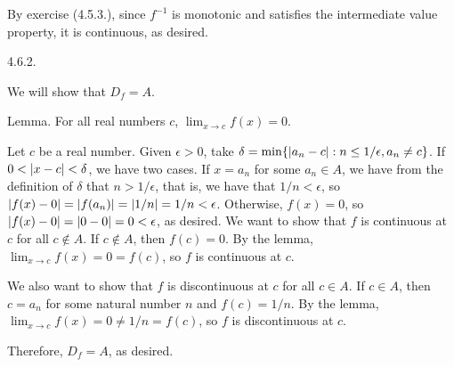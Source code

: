 By exercise (4.5.3.), since $f^{-1}$ is monotonic and
satisfies the intermediate value property, it is continuous, as desired.
\bigskip
\item{4.6.2.}

We will show that $D_f = A$.

\proclaim Lemma. For all real numbers $c$, $\lim _{x \to c} f(x) = 0$.

Let $c$ be a real number.
Given $\epsilon > 0$, take $\delta = \min \{\vert a_n - c\vert : n \le 1/\epsilon, a_n \ne c\}$.
If $0 < \vert x - c\vert < \delta$, we have two cases.
If $x = a_n$ for some $a_n \in A$,
we have from the definition of $\delta$ that $n > 1/\epsilon$,
that is, we have that $1/n < \epsilon$,
so $\vert f(x) - 0\vert = \vert f(a_n)\vert = \vert1/n\vert = 1/n < \epsilon$.
Otherwise, $f(x) = 0$, so $\vert f(x) - 0\vert = \vert0 - 0\vert = 0 < \epsilon$, as desired.
\medskip
We want to show that $f$ is continuous at $c$ for all $c \notin A$.
If $c \notin A$, then $f(c) = 0$.
By the lemma, $\lim _{x \to c} f(x) = 0 = f(c)$,
so $f$ is continuous at $c$.

We also want to show that $f$ is discontinuous at $c$
for all $c \in A$.
If $c \in A$, then $c = a_n$ for some natural number $n$ and $f(c) = 1/n$.
By the lemma, $\lim _{x \to c} f(x) = 0 \ne 1/n = f(c)$,
so $f$ is discontinuous at $c$.

Therefore, $D_f = A$, as desired.
\bye

